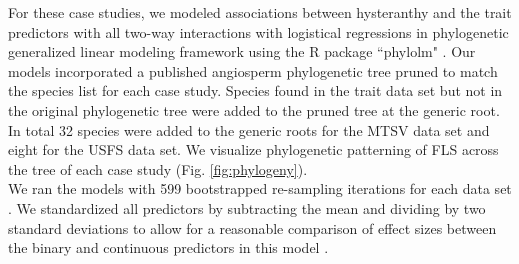\documentclass{article}\usepackage[]{graphicx}\usepackage[]{color}
\begin{document}
\noindent For these case studies, we modeled associations between hysteranthy and the trait predictors with all two-way interactions with logistical regressions in phylogenetic generalized linear modeling framework \citep{Ives2010} using the R package ``phylolm" \citep{Ho2014}. Our models incorporated a published angiosperm phylogenetic tree \citep{Zanne2013} pruned to match the species list for each case study. Species found in the trait data set but not in the original phylogenetic tree were added to the pruned tree at the generic root. In total 32 species were added to the generic roots for the MTSV data set and eight for the USFS data set. We visualize phylogenetic patterning of FLS across the tree of each case study (Fig. \ref{fig:phylogeny}).\\

\noindent We ran the models with 599 bootstrapped re-sampling iterations for each data set \citep{Wilcox2010}. We standardized all predictors by subtracting the mean and dividing by two standard deviations to allow for a reasonable comparison of effect sizes between the binary and continuous predictors in this model \citep{Gelman2007}. 
\end{document}
